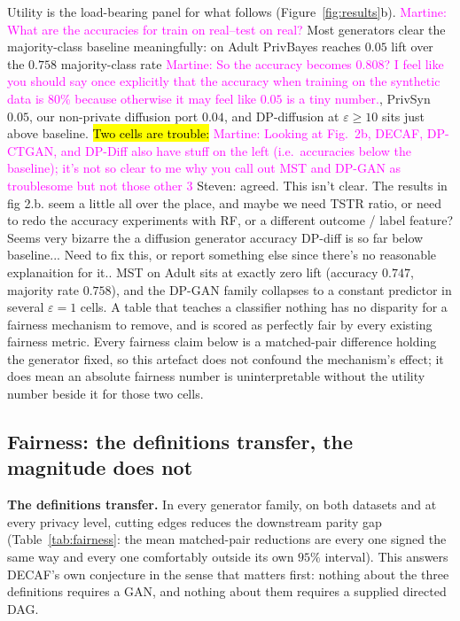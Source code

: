 \documentclass{article}
\newcommand{\martine}[1]{\textcolor{magenta}{Martine: #1}}
\newcommand{\s}[1]{\textcolor{Dandelion}{Steven: #1}}
\begin{document}
Utility is the load-bearing panel for what follows (Figure~\ref{fig:results}b). \martine{What are the accuracies for train on real--test on real?}
Most generators clear the majority-class baseline meaningfully: on Adult
PrivBayes reaches $0.05$ lift over the $0.758$ majority-class rate \martine{So the accuracy becomes 0.808? I feel like you should say once explicitly that the accuracy when training on the synthetic data is 80\% because otherwise it may feel like $0.05$ is a tiny number.}, PrivSyn
$0.05$, our non-private diffusion port $0.04$, and DP-diffusion at
$\varepsilon\geq10$ sits just above baseline. \hl{Two cells are trouble:} \martine{Looking at Fig.~2b, DECAF, DP-CTGAN, and DP-Diff also have stuff on the left (i.e.~accuracies below the baseline); it's not so clear to me why you call out MST and DP-GAN as troublesome but not those other 3} \s{agreed. This isn't clear. The results in fig 2.b. seem a little all over the place, and maybe we need TSTR ratio, or need to redo the accuracy experiments with RF, or a different outcome / label feature? Seems very bizarre the a diffusion generator accuracy DP-diff is so far below baseline... Need to fix this, or report something else since there's no reasonable explanaition for it..} MST on
Adult sits at exactly zero lift (accuracy $0.747$, majority rate $0.758$),
and the DP-GAN family collapses to a constant predictor in several
$\varepsilon{=}1$ cells. A table that teaches a classifier nothing has no
disparity for a fairness mechanism to remove, and is scored as perfectly
fair by every existing fairness metric. Every fairness claim below is a
matched-pair difference holding the generator fixed, so this artefact does not
confound the mechanism's effect; it does mean an absolute fairness number is
uninterpretable without the utility number beside it for those two cells.

\subsection{Fairness: the definitions transfer, the magnitude does not}



\textbf{The definitions transfer.} In every generator family, on both
datasets and at every privacy level, cutting edges reduces the downstream
parity gap (Table~\ref{tab:fairness}: the mean matched-pair reductions are
every one signed the same way and every one comfortably outside its own
$95\%$ interval). This answers DECAF's own conjecture in the sense that
matters first: nothing about the three definitions requires a GAN, and
nothing about them requires a supplied directed DAG.
\end{document}
